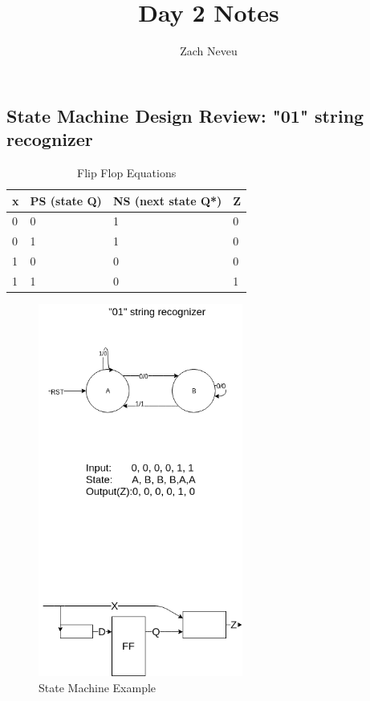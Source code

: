 \documentclass[12pt, letter]{article}
\author{Zach Neveu}
\title{ Day 2 Notes }
\begin{document}
\maketitle
\subsection*{State Machine Design Review: "01" string recognizer}

\begin{table}[h]
	\centering
	\caption{Flip Flop Equations}
	\label{tab:label}
	\begin{tabular}{llll}
	\toprule
	x & PS (state Q) & NS (next state Q*) & Z \\
	\midrule
	0 & 0 & 1 & 0 \\
	\midrule
	0 & 1 & 1 & 0 \\
	\midrule
	1 & 0 & 0 & 0 \\
	\midrule
	1 & 1 & 0 & 1 \\
	\end{tabular}
\end{table}

\begin{figure}[h]
	\centering
	\includegraphics[width=0.6\textwidth]{state_machine}
	\caption{State Machine Example}
	\label{fig:state_machine}
\end{figure}
\end{document}
